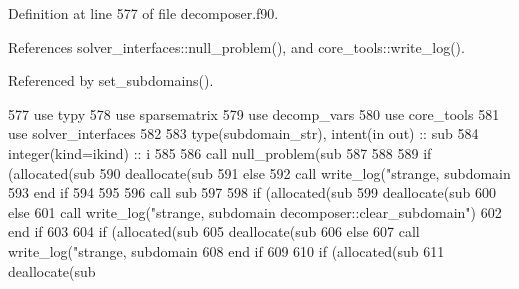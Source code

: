 Definition at line 577 of file decomposer.\+f90.



References solver\+\_\+interfaces\+::null\+\_\+problem(), and core\+\_\+tools\+::write\+\_\+log().



Referenced by set\+\_\+subdomains().


\begin{DoxyCode}
577       \textcolor{keywordtype}{use }typy
578       \textcolor{keywordtype}{use }sparsematrix
579       \textcolor{keywordtype}{use }decomp_vars
580       \textcolor{keywordtype}{use }core_tools
581       \textcolor{keywordtype}{use }solver_interfaces
582       
583       \textcolor{keywordtype}{type}(subdomain_str), \textcolor{keywordtype}{intent(in out)} :: sub
584       \textcolor{keywordtype}{integer(kind=ikind)} :: i
585       
586       \textcolor{keyword}{call }null_problem(sub%
587       
588       
589       \textcolor{keywordflow}{if} (\textcolor{keyword}{allocated}(sub%
590         \textcolor{keyword}{deallocate}(sub%
591       \textcolor{keywordflow}{else}
592         \textcolor{keyword}{call }write_log(\textcolor{stringliteral}{"strange, subdomain%
593 \textcolor{comment}{}\textcolor{keywordflow}{      end if} 
594      
595  
596       \textcolor{keyword}{call }sub%
597 
598       \textcolor{keywordflow}{if} (\textcolor{keyword}{allocated}(sub%
599         \textcolor{keyword}{deallocate}(sub%
600       \textcolor{keywordflow}{else}
601         \textcolor{keyword}{call }write_log(\textcolor{stringliteral}{"strange, subdomain%
       decomposer::clear\_subdomain"}\textcolor{comment}{)}
602 \textcolor{comment}{}\textcolor{keywordflow}{      end if} 
603       
604       \textcolor{keywordflow}{if} (\textcolor{keyword}{allocated}(sub%
605         \textcolor{keyword}{deallocate}(sub%
606       \textcolor{keywordflow}{else}
607         \textcolor{keyword}{call }write_log(\textcolor{stringliteral}{"strange, subdomain%
608 \textcolor{comment}{}\textcolor{keywordflow}{      end if} 
609       
610       \textcolor{keywordflow}{if} (\textcolor{keyword}{allocated}(sub%
611         \textcolor{keyword}{deallocate}(sub%
}}
\end{DoxyCode}
